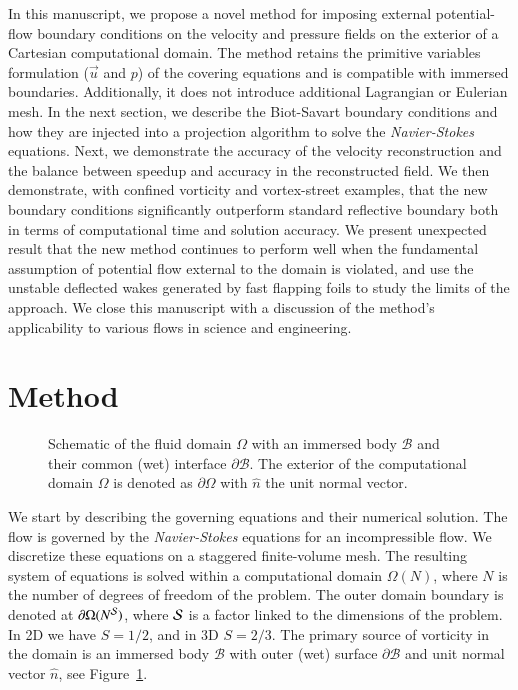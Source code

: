 \documentclass[preprint,12pt]{elsarticle}
\begin{document}
In this manuscript, we propose a novel method for imposing external potential-flow boundary conditions on the velocity and pressure fields on the exterior of a Cartesian computational domain. The method retains the primitive variables formulation ($\vec u$ and $p$) of the covering equations and is compatible with immersed boundaries. Additionally, it does not introduce additional Lagrangian or Eulerian mesh. In the next section, we describe the Biot-Savart boundary conditions and how they are injected into a projection algorithm to solve the \emph{Navier-Stokes} equations. Next, we demonstrate the accuracy of the velocity reconstruction and the balance between speedup and accuracy in the reconstructed field. We then demonstrate, with confined vorticity and vortex-street examples, that the new boundary conditions significantly outperform standard reflective boundary both in terms of computational time and solution accuracy. We present unexpected result that the new method continues to perform well when the fundamental assumption of potential flow external to the domain is violated, and use the unstable deflected wakes generated by fast flapping foils to study the limits of the approach. We close this manuscript with a discussion of the method's applicability to various flows in science and engineering.

\section{Method}

\begin{figure}
    \centering
    \def\svgwidth{0.8\columnwidth}
    
    \caption{Schematic of the fluid domain $\Omega$ with an immersed body $\mathcal{B}$ and their common (wet) interface $\partial\mathcal{B}$. The exterior of the computational domain $\Omega$ is denoted as $\partial\Omega$ with $\hat{n}$ the unit normal vector.}
    \label{Fig_1}
\end{figure}

We start by describing the governing equations and their numerical solution.
The flow is governed by the \emph{Navier-Stokes} equations for an incompressible flow. We discretize these equations on a staggered finite-volume mesh. The resulting system of equations is solved within a computational domain $\Omega(N)$, where $N$ is the number of degrees of freedom of the problem. The outer domain boundary is denoted at $\partial\Omega(N^{\cal S})$, where $\cal S$ is a factor linked to the dimensions of the problem. In 2D we have $S=1/2$, and in 3D $S=2/3$. The primary source of vorticity in the domain is an immersed body $\mathcal{B}$ with outer (wet) surface $\partial\mathcal{B}$ and unit normal vector $\hat n$, see Figure~\ref{Fig_1}.
\end{document}
